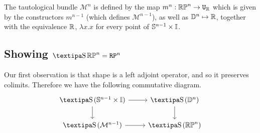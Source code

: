 \documentclass{amsart}
\begin{document}
\begin{definition}
\label{defn:tautologicalbundle}
The tautological bundle $\mathcal{M}^n$ is defined by the map $m^n: \mathbb{RP}^n \rightarrow \mathtt{U}_{\mathbb{R}}$ which is given by the constructors $m^{n-1}$ (which defines $\mathcal{M}^{n-1}$), as well as $\mathbb{D}^n \mapsto \mathbb{R}$, together with the equivalence $\mathbb{R}$, $\lambda x.x$ for every point of $\mathbb{S}^{n-1} \times \mathbb{I}$.
\end{definition}



\subsection{Showing $ \shape \set{RP}^n = \RP^n $}
Our first observation is that shape is a left adjoint operator, and so it preserves colimits. Therefore we have the following commutative diagram.
\[\begin{tikzcd}
\shape(\set{S}^{n-1} \times \set{I}) \arrow[r] \arrow[d] &\shape (\set{D}^{n}) \arrow[d]\\
\shape (\mathcal{M}^{n-1}) \arrow[r] &\shape (\set{RP}^n)\\
\end{tikzcd}
\] 
\end{document}
